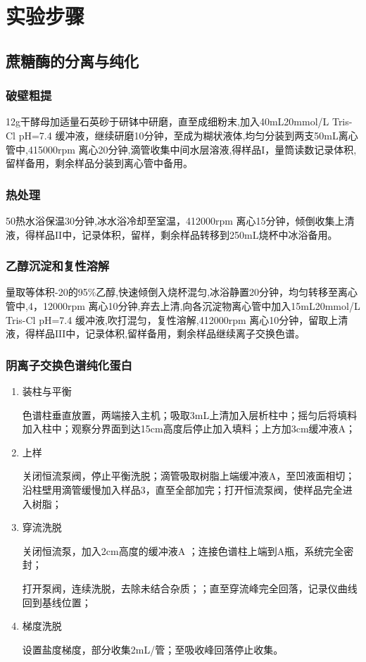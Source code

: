 \section{实验步骤}

\subsection{蔗糖酶的分离与纯化}
\subsubsection{破壁粗提}
12g干酵母加适量石英砂于研钵中研磨，直至成细粉末,加入40mL20mmol/L Tris-Cl pH=7.4 缓冲液，继续研磨10分钟，至成为糊状液体,均匀分装到两支50mL离心管中,4\dc 15000rpm 离心20分钟,滴管收集中间水层溶液,得样品$\mathrm{I}$，量筒读数记录体积,留样备用，剩余样品分装到离心管中备用。
\subsubsection{热处理}
50\dc 热水浴保温30分钟,冰水浴冷却至室温，4\dc  12000rpm 离心15分钟，倾倒收集上清液，得样品$\mathrm{II}$中，记录体积，留样，剩余样品转移到250mL烧杯中冰浴备用。
\subsubsection{乙醇沉淀和复性溶解}
量取等体积-20\dc 的95\%乙醇,快速倾倒入烧杯混匀,冰浴静置20分钟，均匀转移至离心管中,4\dc ，12000rpm 离心10分钟,弃去上清,向各沉淀物离心管中加入15mL20mmol/L Tris-Cl pH=7.4 缓冲液,吹打混匀，复性溶解,4\dc  12000rpm 离心10分钟，留取上清液，得样品$\mathrm{III}$中，记录体积,留样备用，剩余样品继续离子交换色谱。
\subsubsection{阴离子交换色谱纯化蛋白}

\begin{enumerate}
\item 装柱与平衡
\par 色谱柱垂直放置，两端接入主机；吸取3mL上清加入层析柱中；摇匀后将填料加入柱中；观察分界面到达15cm高度后停止加入填料；上方加3cm缓冲液A；
\item  上样
   \par 关闭恒流泵阀，停止平衡洗脱；滴管吸取树脂上端缓冲液A，至凹液面相切；沿柱壁用滴管缓慢加入样品3，直至全部加完；打开恒流泵阀，使样品完全进入树脂；
\item 穿流洗脱
    \par 关闭恒流泵，加入2cm高度的缓冲液A ；连接色谱柱上端到A瓶，系统完全密封；
    \par 打开泵阀，连续洗脱，去除未结合杂质；；直至穿流峰完全回落，记录仪曲线回到基线位置；
\item 梯度洗脱
 \par 设置盐度梯度，部分收集2mL/管；至吸收峰回落停止收集。
\end{enumerate}

